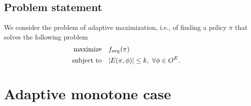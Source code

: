 
\subsection{Problem statement}
We consider the problem of adaptive maximization, i.e., of finding a policy $\pi$ that solves the following problem
\begin{align*}
  \textrm{maximize}&\quad  f_{\mathrm{avg}}(\pi)\\
  \textrm{subject to}&\quad  |E(\pi, \phi)| \leq k,\ \forall \phi \in O^E.
\end{align*}

\section{Adaptive monotone case}

